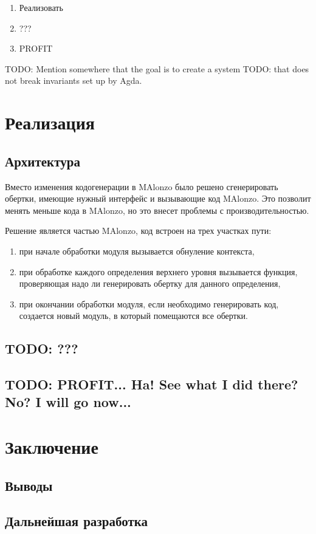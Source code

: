 \begin{enumerate}
\item Реализовать
\item ???
\item PROFIT
\end{enumerate}

TODO: Mention somewhere that the goal is to create a system
TODO: that does not break invariants set up by Agda.

\newpage
\section{Реализация}

\subsection{Архитектура}

Вместо изменения кодогенерации в MAlonzo было решено сгенерировать
обертки, имеющие нужный интерфейс и вызывающие код MAlonzo. Это
позволит менять меньше кода в MAlonzo, но это внесет проблемы с производительностью.

Решение является частью MAlonzo, код встроен на трех участках пути:
\begin{enumerate}
\item при начале обработки модуля вызывается обнуление контекста,
\item при обработке каждого определения верхнего уровня вызывается
      функция, проверяющая надо ли генерировать обертку для данного определения,
\item при окончании обработки модуля, если необходимо генерировать код, создается
      новый модуль, в который помещаются все обертки.
\end{enumerate}

\subsection{TODO: ???}

\subsection{TODO: PROFIT... Ha! See what I did there? No? I will go now...}

\newpage
\section{Заключение}

\subsection{Выводы}

\subsection{Дальнейшая разработка}
